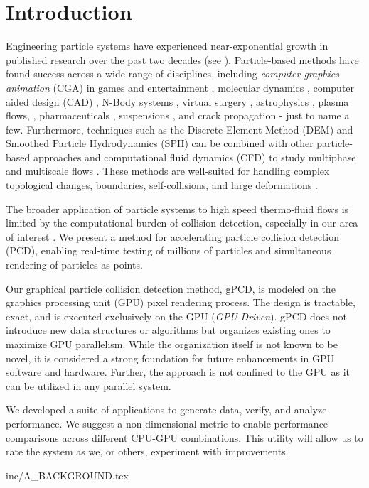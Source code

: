 \section{Introduction} \label{intro}

Engineering particle systems have experienced near-exponential growth in published research over the past two decades (see ).  Particle-based methods have found success across a wide range of disciplines, including \textit{computer graphics animation} (CGA) in games and entertainment \citep{ericson2004}, molecular dynamics  \cite{anderson2008}, computer aided design ({CAD}) \cite{bronson2012}, N-Body systems \cite{visser2023}, virtual surgery \cite{Kim2006a}, astrophysics \cite{PhantomSmoothedParticle}, plasma flows, \cite{romanenko2019,gupta2017}, pharmaceuticals \cite{Mansour2015}, suspensions \cite{butler2018}, and crack propagation \cite{Vesga2007} - just to name a few. Furthermore, techniques such as the Discrete Element Method (DEM) and Smoothed Particle Hydrodynamics (SPH) can be combined with other particle-based approaches and computational fluid dynamics (CFD) to study multiphase and multiscale flows \cite{Young2022,he2018}. These methods are well-suited for handling complex topological changes, boundaries, self-collisions, and large deformations \cite{wang2020,adami2012}.

The broader application of particle systems to high speed thermo-fluid flows is limited by the computational burden of collision detection, especially in our area of interest . We present a method for accelerating particle collision detection (PCD), enabling real-time testing of millions of particles and simultaneous rendering of particles as points.  

%

Our graphical particle collision detection method, gPCD, is modeled on the graphics processing unit (GPU) pixel rendering process. The design is tractable, exact, and is executed exclusively on the GPU (\textit{GPU Driven}). gPCD does not introduce new data structures or algorithms but organizes existing ones to maximize GPU parallelism. While the organization itself is not known to be novel, it is considered a strong foundation for future enhancements in GPU software and hardware. Further, the approach is not confined to the GPU as it can be utilized in any parallel system.

We developed a suite of applications to generate data, verify, and analyze performance. We suggest a non-dimensional metric to enable performance comparisons across different CPU-GPU combinations. This utility will allow us to rate the system as we, or others, experiment with improvements. 

 {inc/A_BACKGROUND.tex}